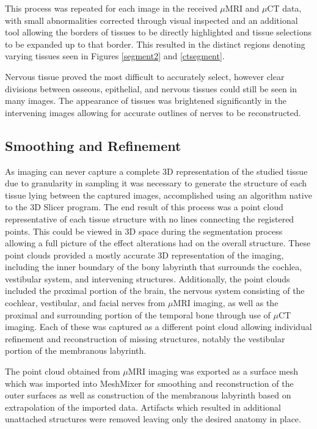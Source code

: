 \documentclass[12pt]{article}
\begin{document}
This process was repeated for each image in the received $\mu$MRI and $\mu$CT data, with small abnormalities corrected through visual inspected and an additional tool allowing the borders of tissues to be directly highlighted and tissue selections to be expanded up to that border. This resulted in the distinct regions denoting varying tissues seen in Figures \ref{segment2} and \ref{ctsegment}.

Nervous tissue proved the most difficult to accurately select, however clear divisions between osseous, epithelial, and nervous tissues could still be seen in many images. The appearance of tissues was brightened significantly in the intervening images allowing for accurate outlines of nerves to be reconstructed.

\subsection{Smoothing and Refinement}
As imaging can never capture a complete 3D representation of the studied tissue due to granularity in sampling it was necessary to generate the structure of each tissue lying between the captured images, accomplished using an algorithm native to the 3D Slicer program. \cite{slicer} The end result of this process was a point cloud representative of each tissue structure with no lines connecting the registered points. This could be viewed in 3D space during the segmentation process allowing a full picture of the effect alterations had on the overall structure. These point clouds provided a mostly accurate 3D representation of the imaging, including the inner boundary of the bony labyrinth that surrounds the cochlea, vestibular system, and intervening structures. Additionally, the point clouds included the proximal portion of the brain, the nervous system consisting of the cochlear, vestibular, and facial nerves from $\mu$MRI imaging, as well as the proximal and surrounding portion of the temporal bone through use of $\mu$CT imaging. Each of these was captured as a different point cloud allowing individual refinement and reconstruction of missing structures, notably the vestibular portion of the membranous labyrinth.



The point cloud obtained from $\mu$MRI imaging was exported as a surface mesh which was imported into MeshMixer for smoothing and reconstruction of the outer surfaces as well as construction of the membranous labyrinth based on extrapolation of the imported data. Artifacts which resulted in additional unattached structures were removed leaving only the desired anatomy in place. 
\end{document}

